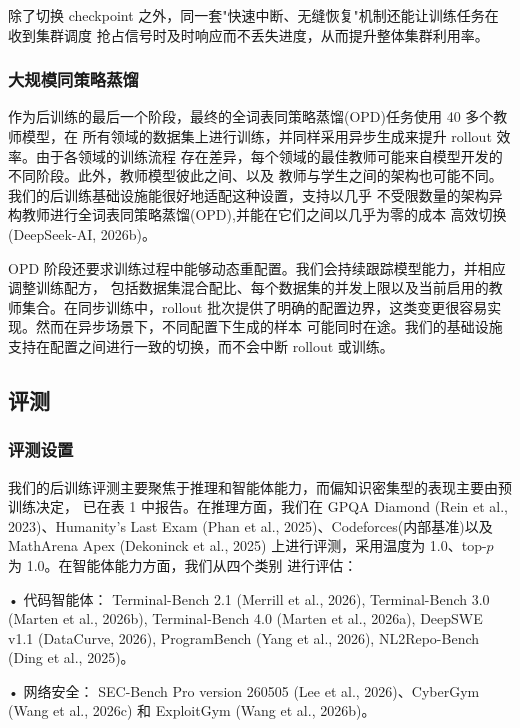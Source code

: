 \documentclass[
  10
]{article}
\begin{document}
除了切换 checkpoint 之外，同一套"快速中断、无缝恢复"机制还能让训练任务在收到集群调度
抢占信号时及时响应而不丢失进度，从而提升整体集群利用率。

\subsubsection{大规模同策略蒸馏}\label{large-scale-on-policy-distillation}

作为后训练的最后一个阶段，最终的全词表同策略蒸馏(OPD)任务使用 40 多个教师模型，在
所有领域的数据集上进行训练，并同样采用异步生成来提升 rollout 效率。由于各领域的训练流程
存在差异，每个领域的最佳教师可能来自模型开发的不同阶段。此外，教师模型彼此之间、以及
教师与学生之间的架构也可能不同。我们的后训练基础设施能很好地适配这种设置，支持以几乎
不受限数量的架构异构教师进行全词表同策略蒸馏(OPD),并能在它们之间以几乎为零的成本
高效切换 (DeepSeek-AI, 2026b)。



OPD 阶段还要求训练过程中能够动态重配置。我们会持续跟踪模型能力，并相应调整训练配方，
包括数据集混合配比、每个数据集的并发上限以及当前启用的教师集合。在同步训练中，rollout
批次提供了明确的配置边界，这类变更很容易实现。然而在异步场景下，不同配置下生成的样本
可能同时在途。我们的基础设施支持在配置之间进行一致的切换，而不会中断 rollout 或训练。

\subsection{评测}\label{evaluation}

\subsubsection{评测设置}\label{evaluation-setup}

我们的后训练评测主要聚焦于推理和智能体能力，而偏知识密集型的表现主要由预训练决定，
已在表 1 中报告。在推理方面，我们在 GPQA Diamond (Rein et al., 2023)、Humanity's Last
Exam (Phan et al., 2025)、Codeforces(内部基准)以及 MathArena Apex (Dekoninck et al.,
2025) 上进行评测，采用温度为 1.0、top-$p$ 为 1.0。在智能体能力方面，我们从四个类别
进行评估：

• 代码智能体： Terminal-Bench 2.1 (Merrill et al., 2026), Terminal-Bench
3.0 (Marten et al., 2026b), Terminal-Bench 4.0 (Marten et al., 2026a),
DeepSWE v1.1 (DataCurve, 2026), ProgramBench (Yang et al., 2026),
NL2Repo-Bench (Ding et al., 2025)。

• 网络安全： SEC-Bench Pro version 260505 (Lee et al., 2026)、CyberGym
(Wang et al., 2026c) 和 ExploitGym (Wang et al., 2026b)。
\end{document}
